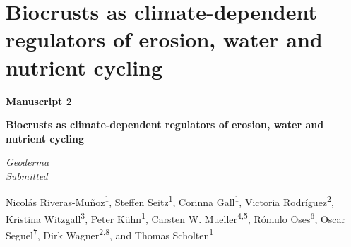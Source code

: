 \chapter{Biocrusts as climate-dependent regulators of erosion, water and nutrient cycling}
\label{chap:manuscript2} %

\begin{center}
  \textbf{\Large Manuscript 2}
\end{center}

\vspace{0.1cm}

\begin{center}
  \textbf{\huge Biocrusts as climate-dependent regulators of erosion, water and nutrient cycling}
\end{center}

\vspace{0.2cm}

\begin{center}
  \textit{Geoderma}\\
  \textit{Submitted}
\end{center}
\vspace{0.1cm}

\begin{justify}
  Nicolás Riveras-Muñoz\textsuperscript{1}, Steffen Seitz\textsuperscript{1}, Corinna Gall\textsuperscript{1}, Victoria Rodríguez\textsuperscript{2}, Kristina Witzgall\textsuperscript{3}, Peter Kühn\textsuperscript{1}, Carsten W. Mueller\textsuperscript{4,5}, Rómulo Oses\textsuperscript{6}, Oscar Seguel\textsuperscript{7}, Dirk Wagner\textsuperscript{2,8}, and Thomas Scholten\textsuperscript{1}
\end{justify}

\vspace{0.2cm}

